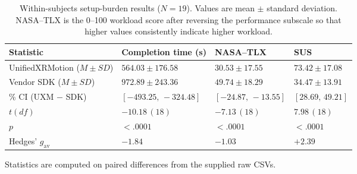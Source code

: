\documentclass[runningheads]{llncs}
\begin{document}
\begin{table}[t]
	\caption{Within-subjects setup-burden results ($N=19$). Values are mean $\pm$ standard deviation. NASA--TLX is the 0--100 workload score after reversing the performance subscale so that higher values consistently indicate higher workload. \protect}
	\label{tab:user-results}
	\centering
	\scriptsize
	\setlength{\tabcolsep}{3.5pt}
	\renewcommand{\arraystretch}{1.08}
	\begin{tabularx}{\textwidth}{@{}>{\raggedright\arraybackslash}X
		>{\centering\arraybackslash}p{28mm}
		>{\centering\arraybackslash}p{24mm}
		>{\centering\arraybackslash}p{23mm}@{}}
		\toprule
		Statistic & Completion time (s)   & NASA--TLX & SUS \\
		\midrule
		UnifiedXRMotion ($M\!\pm\!SD$)
		          & $564.03\!\pm\!176.58$
		          & $30.53\!\pm\!17.55$
		          & $73.42\!\pm\!17.08$                     \\
		Vendor SDK ($M\!\pm\!SD$)
		          & $972.89\!\pm\!243.36$
		          & $49.74\!\pm\!18.29$
		          & $34.47\!\pm\!13.91$                     \\
		95\% CI (UXM $-$ SDK)
		          & $[-493.25,\,-324.48]$
		          & $[-24.87,\,-13.55]$
		          & $[28.69,\,49.21]$                       \\
		$t(df)$
		          & $-10.18\,(18)$
		          & $-7.13\,(18)$
		          & $7.98\,(18)$                            \\
		$p$
		          & $<.0001$
		          & $<.0001$
		          & $<.0001$                                \\
		Hedges' $g_{\mathrm{av}}$
		          & $-1.84$
		          & $-1.03$
		          & $+2.39$                                 \\
		\bottomrule
	\end{tabularx}

	\vspace{2pt}
	{\footnotesize Statistics are computed on paired differences from the supplied raw CSVs. \par}
\end{table}
\end{document}
